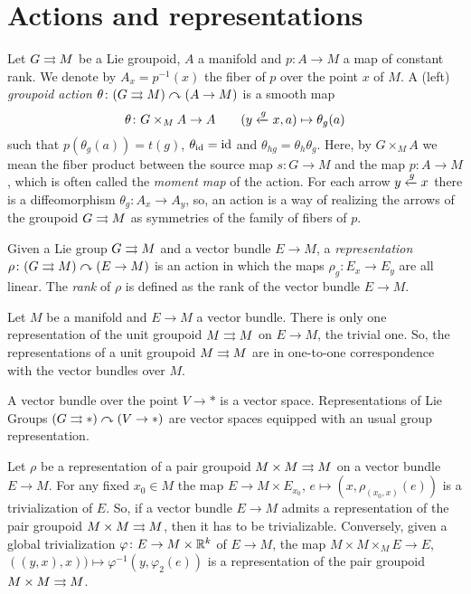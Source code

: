 %
%

\section{Actions and representations}\label{sec:actions-and-representations}

Let $G\rightrightarrows M$ be a Lie groupoid, $A$ a manifold and $p\colon A\to M$ a map of constant rank.
We denote by $A_x=p^{-1}(x)$ the fiber of $p$ over the point $x$ of $M$.
A (left) \emph{groupoid action} $\theta\colon (G\rightrightarrows M)\curvearrowright (A\to M)$ is a smooth map
\[ \theta\colon G\times_M A\to A \qquad (y\xleftarrow{g}x, a)\mapsto \theta_g(a) \]
such that $p(\theta_g(a)) = t(g)$, $\theta_{\operatorname{id}}=\operatorname{id}$ and $\theta_{hg}=\theta_h\theta_g$.
Here, by $G\times_M A$ we mean the fiber product between the source map $s\colon G\to M$ and the map $p\colon A\to M$, which is often called the \emph{moment map} of the action.
For each arrow $y\xleftarrow g x$ there is a diffeomorphism $\theta_g\colon A_x\to A_y$, so, an action is a way of realizing the arrows of the groupoid $G\rightrightarrows M$ as symmetries of the family of fibers of $p$.

Given a Lie group $G\rightrightarrows M$ and a vector bundle $E\to M$, a \emph{representation} $\rho\colon (G\rightrightarrows M)\curvearrowright (E\to M)$ is an action in which the maps $\rho_g\colon E_x\to E_y$ are all linear.
%
The \emph{rank} of $\rho$ is defined as the rank of the vector bundle $E\to M$.

\begin{example}
Let $M$ be a manifold and $E\to M$ a vector bundle.
There is only one representation of the unit groupoid $M\rightrightarrows M$ on $E\to M$, the trivial one.
So, the representations of a unit groupoid $M\rightrightarrows M$ are in one-to-one correspondence with the vector bundles over $M$.
\end{example}

\begin{example}
A vector bundle over the point $V\to *$ is a vector space.
Representations of Lie Groups $(G\rightrightarrows *)\curvearrowright (V\to *)$ are vector spaces equipped with an usual group representation.
\end{example}

\begin{example}
Let $\rho$ be a representation of a pair groupoid $M\times M\rightrightarrows M$ on a vector bundle $E\to M$.
For any fixed $x_0\in M$ the map $E\to M\times E_{x_0}$, $e\mapsto (x, \rho_{(x_0,x)}(e))$ is a trivialization of $E$.
So, if a vector bundle $E\to M$ admits a representation of the pair groupoid $M\times M\rightrightarrows M$, then it has to be trivializable.
Conversely, given a global trivialization $\varphi\colon E\to M\times\mathbb R^k$ of $E\to M$, the map $M\times M\times_M E \to E$, $((y,x),x))\mapsto \varphi^{-1}(y,\varphi_2(e))$ is a representation of the pair groupoid $M\times M\rightrightarrows M$.
\end{example}

